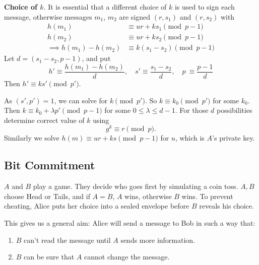 \documentclass{article}
\newcommand{\1}[1]{\mathbbm{1}_{#1}}
\begin{document}
\textbf{Choice of $k$}. It is essential that a different choice of $k$ is used to sign each message, otherwise messages $m_1$, $m_2$ are signed $(r, s_1)$ and $(r, s_2)$ with
\begin{align*}
    h(m_1) &\equiv ur + ks_1 \pmod{p-1} \\
    h(m_2) &\equiv ur + ks_2 \pmod{p-1} \\
    \implies h(m_1) - h(m_2) &\equiv k(s_1 - s_2) \pmod{p-1}
\end{align*}
Let $d = (s_1 - s_2, p-1)$, and put
\begin{equation*}
    h' \equiv \frac{h(m_1) - h(m_2)}{d}, \quad s' \equiv \frac{s_1 - s_2}{d}, \quad p\ \equiv \frac{p-1}{d}
\end{equation*}
Then $h' \equiv k s' \pmod{p'}$.

As $(s', p') = 1$, we can solve for $k \pmod{p'}$.
So $k \equiv k_0 \pmod{p'}$ for some $k_0$. Then $k \equiv k_0 + \lambda p' \pmod{p-1}$ for some $0 \leq \lambda \leq d-1$.
For those $d$ possibilities determine correct value of $k$ using
\begin{equation*}
    g^k \equiv r \pmod{p}.
\end{equation*}
Similarly we solve $h(m) \equiv ur + ks \pmod{p-1}$ for $u$, which is $A$'s private key.

\subsection*{Bit Commitment}
$A$ and $B$ play a game. They decide who goes first by simulating a coin toss.
$A,B$ choose Head or Tails, and if $A=B$, $A$ wins, otherwise $B$ wins.
To prevent cheating, Alice puts her choice into a sealed envelope before $B$ reveals his choice.

This gives us a general aim: Alice will send a message to Bob in such a way that:
\begin{enumerate}[label=\arabic*)]
    \item $B$ can't read the message until $A$ sends more information.
    \item $B$ can be sure that $A$ cannot change the message.
\end{enumerate}
\end{document}
